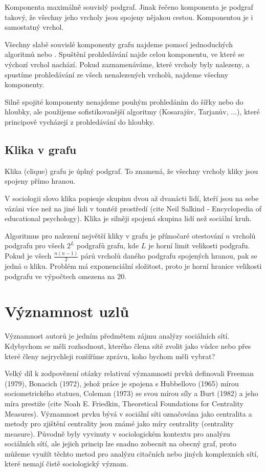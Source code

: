 \documentclass[12pt,titlepage]{report}
\begin{document}
Komponenta maximálně souvislý podgraf. Jinak řečeno komponenta je podgraf
takový, že všechny jeho vrcholy jsou spojeny nějakou cestou. Komponentou je i
samostatný vrchol.

Všechny slabě souvislé komponenty grafu najdeme pomocí jednoduchých algoritmů
 nebo . Spuštění prohledávání najde
celou komponentu, ve které se výchozí vrchol nachází. Pokud zaznamenáváme,
které vrcholy byly nalezeny, a spustíme prohledávání ze všech nenalezených
vrcholů, najdeme všechny komponenty. 

Silně spojité komponenty nenajdeme pouhým prohledáním do šířky nebo do hloubky,
ale použijeme sofistikovanější algoritmy (Kosarajův, Tarjanův, ...), které
principově vycházejí z prohledávání do hloubky.

\subsection{Klika v grafu}
Klika (clique) grafu je úplný podgraf. To znamená, že všechny vrcholy kliky
jsou spojeny přímo hranou.

V sociologii slovo klika popisuje skupinu dvou až dvanácti lidí, kteří jsou na
sebe vázáni více než na jiné lidi v tomtéž prostředí (cite Neil Salkind -
Encyclopedia of educational psychology). Klika je silněji spojená skupina lidí
než sociální kruh.

Algoritmus pro nalezení největší kliky v grafu je přímočaré otestování $n$
vrcholů podgrafu pro všech $2^L$ podgrafů grafu, kde $L$ je horní limit
velikosti podgrafu. Pokud je všech $\frac{n(n - 1)}{2}$ párů vrcholů daného
podgrafu spojených hranou, pak se jedná o kliku. Problém má exponenciální
složitost, proto je horní hranice velikosti podgrafu ve výpočtech omezena na
20.

\section{Významnost uzlů}
Významnost autorů je jedním předmětem zájmu analýzy sociálních sítí. Kdybychom
se měli rozhodnout, kterého člena sítě zvolit jako vůdce nebo přes které členy
nejrychleji rozšíříme zprávu, koho bychom měli vybrat? 

Velký díl k zodpovězení otázky relativní významnosti prvků definovali Freeman
(1979), Bonacich (1972), jehož práce je spojena s Hubbellovo (1965) mírou
sociometrického statusu, Coleman (1973) se svou mírou síly a Burt (1982) a jeho
míra prestiže (cite Noah E. Friedkin, Theoretical Foundations for Centrality Measures). Významnost prvku bývá v sociální síti označována jako centralita
a metody pro zjištění centrality jsou známé jako míry centrality (centrality
measure). Původně byly vyvinuty v sociologickém kontextu pro analýzu sociálních
sítí, ale jejich princip lze snadno zobecnit na obecný graf, proto můžeme
využít těchto metod pro analýzu citačních nebo jiných komplexních sítí, které
nemají čistě sociologický význam.
\end{document}
